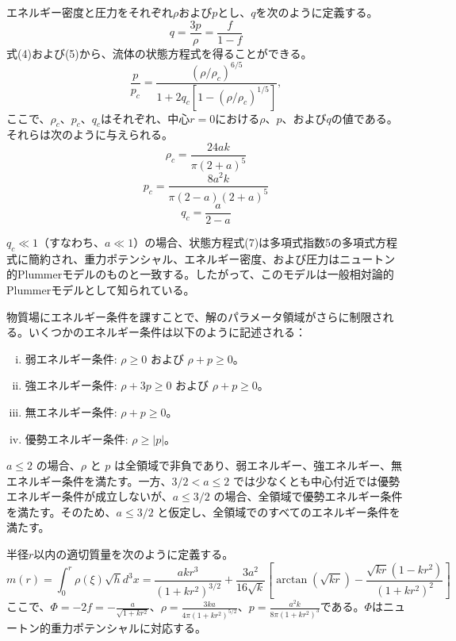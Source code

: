 \documentclass[dvipdfmx]{report} %
\begin{document}
エネルギー密度と圧力をそれぞれ$\rho$および$p$とし、$q$を次のように定義する。
\begin{equation}
    q = \frac{3p}{\rho} = \frac{f}{1 - f}
\end{equation}
式(4)および(5)から、流体の状態方程式を得ることができる。
\begin{equation}
    \frac{p}{p_c} = \frac{(\rho/\rho_c)^{6/5}}{1 + 2q_c[1 - (\rho/\rho_c)^{1/5}]},
\end{equation}
ここで、$\rho_c$、$p_c$、$q_c$はそれぞれ、中心$r = 0$における$\rho$、$p$、および$q$の値である。それらは次のように与えられる。
\begin{equation}
    \rho_c = \frac{24ak}{\pi (2 + a)^5}
\end{equation}
\begin{equation}
    p_c = \frac{8a^2k}{\pi (2 - a)(2 + a)^5}
\end{equation}
\begin{equation}
    q_c = \frac{a}{2 - a}
\end{equation}

$q_c \ll 1$（すなわち、$a \ll 1$）の場合、状態方程式(7)は多項式指数5の多項式方程式に簡約され、重力ポテンシャル、エネルギー密度、および圧力はニュートン的Plummerモデルのものと一致する。したがって、このモデルは一般相対論的Plummerモデルとして知られている。

物質場にエネルギー条件を課すことで、解のパラメータ領域がさらに制限される。いくつかのエネルギー条件は以下のように記述される：
\begin{enumerate}[(i)\,]
    \item 弱エネルギー条件: $\rho \geq 0$ および $\rho + p \geq 0$。
    \item 強エネルギー条件: $\rho + 3p \geq 0$ および $\rho + p \geq 0$。
    \item 無エネルギー条件: $\rho + p \geq 0$。
    \item 優勢エネルギー条件: $\rho \geq |p|$。
\end{enumerate}

$a \leq 2$ の場合、$\rho$ と $p$ は全領域で非負であり、弱エネルギー、強エネルギー、無エネルギー条件を満たす。一方、$3/2 < a \leq 2$ では少なくとも中心付近では優勢エネルギー条件が成立しないが、$a \leq 3/2$ の場合、全領域で優勢エネルギー条件を満たす。そのため、$a \leq 3/2$ と仮定し、全領域でのすべてのエネルギー条件を満たす。

半径$r$以内の適切質量を次のように定義する。
\begin{equation}
    m(r) = \int_0^r \rho(\xi) \sqrt{h} d^3x = \frac{akr^3}{(1 + kr^2)^{3/2}}
    + \frac{3a^2}{16\sqrt{k}} \left[ \arctan(\sqrt{kr}) - \frac{\sqrt{kr}(1 - kr^2)}{(1 + kr^2)^2} \right]
\end{equation}
ここで、$\Phi = -2f = -\frac{a}{\sqrt{1 + kr^2}}$、$\rho = \frac{3ka}{4\pi(1 + kr^2)^{5/2}}$、$p = \frac{a^2k}{8\pi(1 + kr^2)^3}$である。$\Phi$はニュートン的重力ポテンシャルに対応する。
\end{document}
